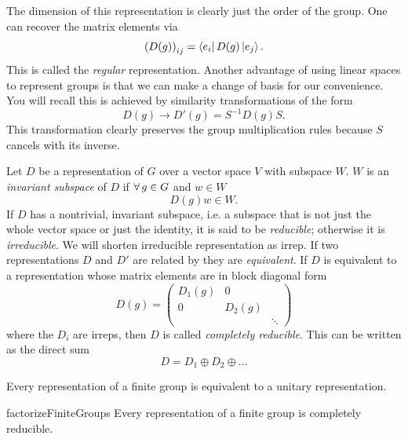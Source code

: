 The dimension of this representation is clearly just the order
of the group. One can recover the matrix elements via
\begin{equation}
  \left(D(g)\right)_{ij}=\bra{e_i}D(g)\ket{e_j}.
\end{equation}
  This is called the {\it regular} 
representation. Another advantage of using linear spaces to represent groups
is that we can make a change of basis for our convenience. You
will recall this is achieved by similarity transformations
of the form
\begin{equation}\label{eq:simtr}
  D(g)\to D'(g)=S^{-1}D(g)S.
\end{equation}
This transformation clearly preserves the group multiplication
rules because $S$ cancels with its inverse.

Let $D$ be a representation of $G$ over a vector space $V$ with
subspace $W$. $W$ is an {\it invariant subspace} 
of $D$ if
$\operatorname{\forall} g\in G$ and $w\in W$
\begin{equation}
  D(g)w\in W.
\end{equation}
If $D$ has a nontrivial, invariant subspace, i.e.
a subspace that is not just the whole vector space or just
the identity, it is said to be {\it reducible};
 otherwise it is {\it irreducible}. 
We will shorten irreducible representation as irrep. If two representations $D$
and $D'$ are related by  they are {\it equivalent}.
If $D$ is equivalent to a representation whose matrix
elements are in block diagonal form
\begin{equation}\label{eq:reducible}
  D(g)=\left(\begin{array}{ccc}
             D_1(g) & 0      &       \\
             0      & D_2(g) &       \\
                    &        & \ddots
             \end{array}\right)
\end{equation}
where the $D_i$ are irreps, then $D$ is called {\it completely
reducible}. This can be written as the direct sum 
\begin{equation}
  D=D_1\oplus D_2\oplus ...
\end{equation}


\begin{theorem}{}{}
  Every representation of a finite group is equivalent to a
  unitary representation.
\end{theorem}
\begin{theorem}{}{factorizeFiniteGroups}
  Every representation of a finite group is completely reducible.
\end{theorem}

